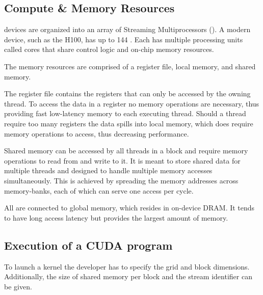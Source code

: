 
\subsection{Compute \& Memory Resources}
\cuda devices are organized into an array of Streaming Multiprocessors (\sm)\cite{hwu_programming_2023}.
A modern \cuda device, such as the \nvidia H100, has up to 144 \sms\cite{elster_nvidia_2022}.
Each \sm has multiple processing units called \cuda cores that share control logic and on-chip memory resources.

The memory resources are comprised of a register file, local memory, and shared memory.

The register file contains the registers that can only be accessed by the owning thread.
To access the data in a register no memory operations are necessary, thus providing fast low-latency memory to each executing thread.
Should a thread require too many registers the data spills into local memory, which does require memory operations to access, thus decreasing performance.

Shared memory can be accessed by all threads in a block and require memory operations to read from and write to it.
It is meant to store shared data for multiple threads and designed to handle multiple memory accesses simultaneously.
This is achieved by spreading the memory addresses across memory-banks, each of which can serve one access per cycle.

All \sms are connected to global memory, which resides in on-device DRAM.
It tends to have long access latency but provides the largest amount of memory.

\subsection{Execution of a CUDA program}

To launch a kernel the developer has to specify the grid and block dimensions.
Additionally, the size of shared memory per block and the stream identifier can be given\cite{hwu_programming_2023}.

